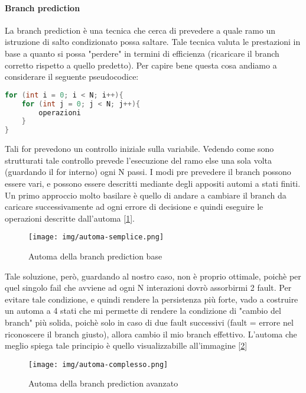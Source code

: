\paragraph{Branch prediction}
La branch prediction è una tecnica che cerca di prevedere a quale ramo un istruzione di salto condizionato possa saltare. Tale tecnica valuta le prestazioni in base a quanto si possa "perdere" in termini di efficienza (ricaricare il branch corretto rispetto a quello predetto).
Per capire bene questa cosa andiamo a considerare il seguente pseudocodice:
\begin{lstlisting}[language=C]
for (int i = 0; i < N; i++){
    for (int j = 0; j < N; j++){
        operazioni
    }
}
\end{lstlisting}

Tali for prevedono un controllo iniziale sulla variabile. Vedendo come sono strutturati tale controllo prevede l'esecuzione del ramo else una sola volta (guardando il for interno) ogni N passi.
I modi pre prevedere il branch possono essere vari, e possono essere descritti mediante degli appositi automi a stati finiti. Un primo approccio molto basilare è quello di andare a cambiare il branch da caricare successivamente ad ogni errore di decisione e quindi eseguire le operazioni descritte dall'automa [\ref{img:automa-semplice}].

\begin{figure}[!ht]
    \centering
    \texttt{[image: img/automa-semplice.png]}
    \caption{Automa della branch prediction base}\label{img:automa-semplice}
\end{figure}

Tale soluzione, però, guardando al nostro caso, non è proprio ottimale, poichè per quel singolo fail che avviene ad ogni N interazioni dovrò assorbirmi 2 fault. Per evitare tale condizione, e quindi rendere la persistenza più forte, vado a costruire un automa a 4 stati che mi permette di rendere la condizione di "cambio del branch" più solida, poichè solo in caso di due fault successivi (fault = errore nel riconoscere il branch giusto), allora cambio il mio branch effettivo. L'automa che meglio spiega tale principio è quello visualizzabille all'immagine [\ref{img:automa-complesso}]

\begin{figure}[!ht]
    \centering
    \texttt{[image: img/automa-complesso.png]}
    \caption{Automa della branch prediction avanzato}\label{img:automa-complesso}
\end{figure}

